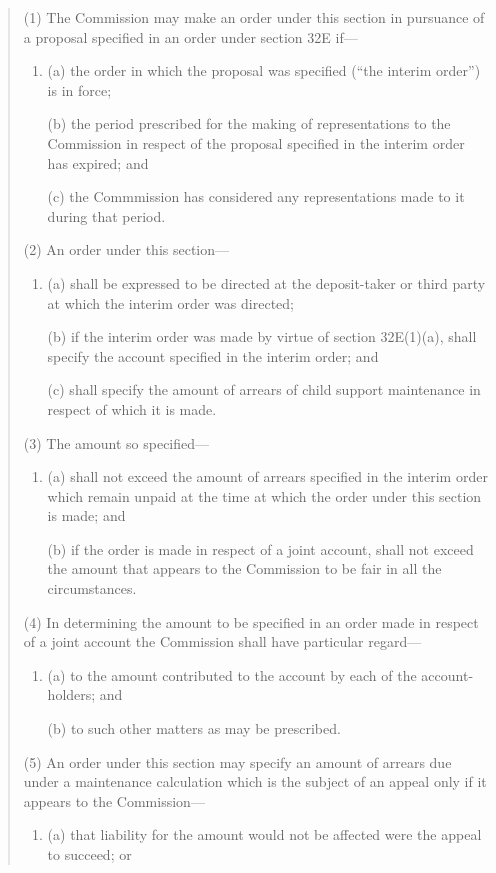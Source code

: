\documentclass[a4paper]{article}
\begin{document}
\begin{quotation}
(1) The Commission may make an order under this section in pursuance of a proposal specified in an order under section 32E if---
\begin{enumerate}\item[]
(a)
the order in which the proposal was specified (“the interim order”) is in force;

(b)
the period prescribed for the making of representations to the Commission in respect of the proposal specified in the interim order has expired; and

(c)
the Commmission has considered any representations made to it during that period.
\end{enumerate}

(2) An order under this section---
\begin{enumerate}\item[]
(a)
shall be expressed to be directed at the deposit-taker or third party at which the interim order was directed;

(b)
if the interim order was made by virtue of section 32E(1)(a), shall specify the account specified in the interim order; and

(c)
shall specify the amount of arrears of child support maintenance in respect of which it is made.
\end{enumerate}

(3) The amount so specified---
\begin{enumerate}\item[]
(a) shall not exceed the amount of arrears specified in the interim order which remain unpaid at the time at which the order under this section is made; and

(b) if the order is made in respect of a joint account, shall not exceed the amount that appears to the Commission to be fair in all the circumstances.
\end{enumerate}

(4)
In determining the amount to be specified in an order made in respect of a joint account the Commission shall have particular regard---
\begin{enumerate}\item[]
(a) to the amount contributed to the account by each of the account-holders; and

(b) to such other matters as may be prescribed.
\end{enumerate}

(5)
An order under this section may specify an amount of arrears due under a maintenance calculation which is the subject of an appeal only if it appears to the Commission---
\begin{enumerate}\item[]
(a) that liability for the amount would not be affected were the appeal to succeed; or


\end{enumerate}
\end{quotation}
\end{document}
